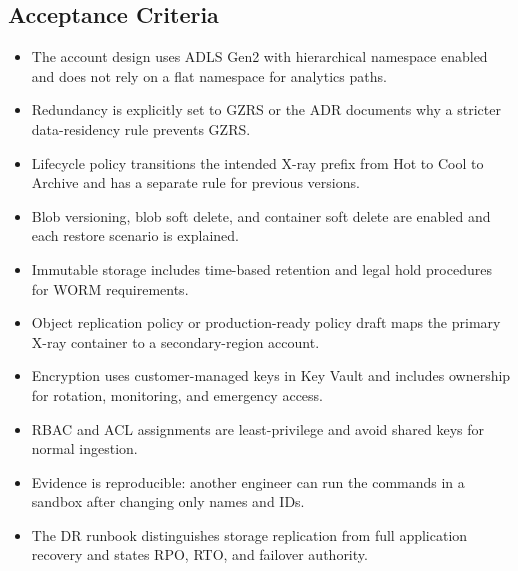 \subsection*{Acceptance Criteria}
\begin{itemize}
    \item The account design uses ADLS Gen2 with hierarchical namespace enabled and does not rely on a flat namespace for analytics paths.
    \item Redundancy is explicitly set to GZRS or the ADR documents why a stricter data-residency rule prevents GZRS.
    \item Lifecycle policy transitions the intended X-ray prefix from Hot to Cool to Archive and has a separate rule for previous versions.
    \item Blob versioning, blob soft delete, and container soft delete are enabled and each restore scenario is explained.
    \item Immutable storage includes time-based retention and legal hold procedures for WORM requirements.
    \item Object replication policy or production-ready policy draft maps the primary X-ray container to a secondary-region account.
    \item Encryption uses customer-managed keys in Key Vault and includes ownership for rotation, monitoring, and emergency access.
    \item RBAC and ACL assignments are least-privilege and avoid shared keys for normal ingestion.
    \item Evidence is reproducible: another engineer can run the commands in a sandbox after changing only names and IDs.
    \item The DR runbook distinguishes storage replication from full application recovery and states RPO, RTO, and failover authority.
\end{itemize}


